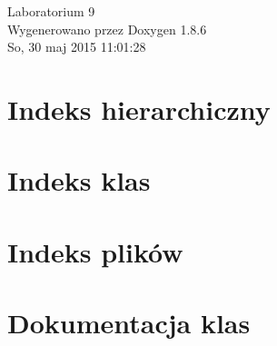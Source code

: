 \documentclass[twoside]{article}
\begin{document}
\hypersetup{pageanchor=false}
\begin{titlepage}
\vspace*{7cm}
\begin{center}%
{\Large Laboratorium 9 }\\
\vspace*{1cm}
{\large Wygenerowano przez Doxygen 1.8.6}\\
\vspace*{0.5cm}
{\small So, 30 maj 2015 11:01:28}\\
\end{center}
\end{titlepage}
\tableofcontents
{}
\hypersetup{pageanchor=true}

\section{Indeks hierarchiczny}

\section{Indeks klas}

\section{Indeks plików}

\section{Dokumentacja klas}



















\end{document}

